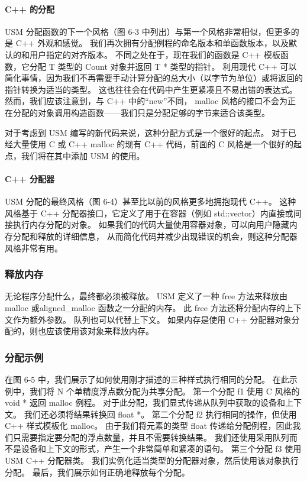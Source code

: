 \paragraph{C++ 的分配}

USM 分配函数的下一个风格（图 6-3 中列出）与第一个风格非常相似，但更多的是 C++ 外观和感觉。 
我们再次拥有分配例程的命名版本和单函数版本，以及默认的和用户指定的对齐版本。 
不同之处在于，现在我们的函数是 C++ 模板函数，它分配 T 类型的 Count 对象并返回 T * 类型的指针。 
利用现代 C++ 可以简化事情，因为我们不再需要手动计算分配的总大小（以字节为单位）或将返回的指针转换为适当的类型。 
这也往往会在代码中产生更紧凑且不易出错的表达式。 
然而，我们应该注意到，与 C++ 中的“new”不同，
malloc 风格的接口不会为正在分配的对象调用构造函数——我们只是分配足够的字节来适合该类型。

对于考虑到 USM 编写的新代码来说，这种分配方式是一个很好的起点。 
对于已经大量使用 C 或 C++ malloc 的现有 C++ 代码，前面的 C 风格是一个很好的起点，我们将在其中添加 USM 的使用。

\paragraph{C++ 分配器}

USM 分配的最终风格（图 6-4）甚至比以前的风格更多地拥抱现代 C++。 
这种风格基于 C++ 分配器接口，它定义了用于在容器（例如 std::vector）内直接或间接执行内存分配的对象。 
如果我们的代码大量使用容器对象，可以向用户隐藏内存分配和释放的详细信息，
从而简化代码并减少出现错误的机会，则这种分配器风格非常有用。

\subsubsection{释放内存}
无论程序分配什么，最终都必须被释放。 
USM 定义了一种 free 方法来释放由 malloc 或aligned\_malloc 函数之一分配的内存。 
此 free 方法还将分配内存的上下文作为额外参数。 队列也可以代替上下文。 
如果内存是使用 C++ 分配器对象分配的，则也应该使用该对象来释放内存。

\subsubsection{分配示例}
在图 6-5 中，我们展示了如何使用刚才描述的三种样式执行相同的分配。 
在此示例中，我们将 N 个单精度浮点数分配为共享分配。 第一个分配 f1 使用 C 风格的 void * 返回 malloc 例程。 
对于此分配，我们显式传递从队列中获取的设备和上下文。 我们还必须将结果转换回 float *。 
第二个分配 f2 执行相同的操作，但使用 C++ 样式模板化 malloc。 
由于我们将元素的类型 float 传递给分配例程，因此我们只需要指定要分配的浮点数量，并且不需要转换结果。 
我们还使用采用队列而不是设备和上下文的形式，产生一个非常简单和紧凑的语句。 
第三个分配 f3 使用 USM C++ 分配器类。 我们实例化适当类型的分配器对象，然后使用该对象执行分配。 
最后，我们展示如何正确地释放每个分配。


